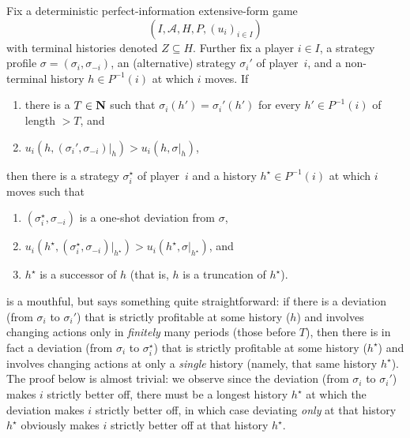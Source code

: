 \begin{lemma}
	\label{lemma:osdp_one_finite}
	Fix a deterministic perfect-information extensive-form game
	\begin{equation*}
		(I,\mathcal{A},H,P,(u_i)_{i \in I}) 
	\end{equation*}
	with terminal histories denoted $Z \subseteq H$. Further fix a player $i \in I$, a strategy profile $\sigma = (\sigma_i,\sigma_{-i})$, an (alternative) strategy $\sigma_i'$ of player~$i$, and a non-terminal history $h \in P^{-1}(i)$ at which $i$ moves.
	If
	
	\begin{enumerate}[label=(\roman*)]
	
		\item there is a $T \in \mathbf{N}$ such that $\sigma_i(h')=\sigma_i'(h')$ for every $h' \in P^{-1}(i)$ of length $> T$, and

		\item $u_i( h, (\sigma_i',\sigma_{-i})|_h ) > u_i( h, \sigma|_h )$,
	
	\end{enumerate}
	then there is a strategy $\sigma^\star_i$ of player~$i$ and a history $h^\star \in P^{-1}(i)$ at which $i$ moves
	such that

	\begin{enumerate}[label=(\Roman*)]
	
		\item $(\sigma^\star_i,\sigma_{-i})$ is a one-shot deviation from $\sigma$,

		\item $u_i( h^\star, (\sigma_i^\star,\sigma_{-i})|_{h^\star} ) > u_i( h^\star, \sigma|_{h^\star} )$, and

		\item $h^\star$ is a successor of $h$ (that is, $h$ is a truncation of $h^\star$).
	
	\end{enumerate}
\end{lemma}

 is a mouthful, but says something quite straightforward: if there is a deviation (from $\sigma_i$ to $\sigma_i'$) that is strictly profitable at some history ($h$) and involves changing actions only in \emph{finitely} many periods (those before $T$), then there is in fact a deviation (from $\sigma_i$ to $\sigma_i^\star$) that is strictly profitable at some history ($h^\star$) and involves changing actions at only a \emph{single} history (namely, that same history $h^\star$). The proof below is almost trivial: we observe since the deviation (from $\sigma_i$ to $\sigma_i'$) makes $i$ strictly better off, there must be a longest history $h^\star$ at which the deviation makes $i$ strictly better off, in which case deviating \emph{only} at that history $h^\star$ obviously makes $i$ strictly better off at that history $h^\star$.

